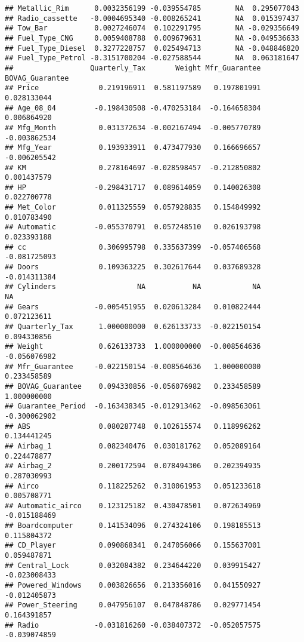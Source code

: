\documentclass[]{article}
\begin{document}
\begin{verbatim}
## Metallic_Rim      0.0032356199 -0.039554785        NA  0.295077043
## Radio_cassette   -0.0004695340 -0.008265241        NA  0.015397437
## Tow_Bar           0.0027246074  0.102291795        NA -0.029356649
## Fuel_Type_CNG     0.0059408788  0.009679631        NA -0.049536633
## Fuel_Type_Diesel  0.3277228757  0.025494713        NA -0.048846820
## Fuel_Type_Petrol -0.3151700204 -0.027588544        NA  0.063181647
##                  Quarterly_Tax       Weight Mfr_Guarantee BOVAG_Guarantee
## Price              0.219196911  0.581197589   0.197801991     0.028133044
## Age_08_04         -0.198430508 -0.470253184  -0.164658304     0.006864920
## Mfg_Month          0.031372634 -0.002167494  -0.005770789    -0.003862534
## Mfg_Year           0.193933911  0.473477930   0.166696657    -0.006205542
## KM                 0.278164697 -0.028598457  -0.212850802     0.001437579
## HP                -0.298431717  0.089614059   0.140026308     0.022700778
## Met_Color          0.011325559  0.057928835   0.154849992     0.010783490
## Automatic         -0.055370791  0.057248510   0.026193798     0.023393188
## cc                 0.306995798  0.335637399  -0.057406568    -0.081725093
## Doors              0.109363225  0.302617644   0.037689328    -0.014311384
## Cylinders                   NA           NA            NA              NA
## Gears             -0.005451955  0.020613284   0.010822444     0.072123611
## Quarterly_Tax      1.000000000  0.626133733  -0.022150154     0.094330856
## Weight             0.626133733  1.000000000  -0.008564636    -0.056076982
## Mfr_Guarantee     -0.022150154 -0.008564636   1.000000000     0.233458589
## BOVAG_Guarantee    0.094330856 -0.056076982   0.233458589     1.000000000
## Guarantee_Period  -0.163438345 -0.012913462  -0.098563061    -0.300062902
## ABS                0.080287748  0.102615574   0.118996262     0.134441245
## Airbag_1           0.082340476  0.030181762   0.052089164     0.224478877
## Airbag_2           0.200172594  0.078494306   0.202394935     0.287030993
## Airco              0.118225262  0.310061953   0.051233618     0.005708771
## Automatic_airco    0.123125182  0.430478501   0.072634969    -0.015188469
## Boardcomputer      0.141534096  0.274324106   0.198185513     0.115804372
## CD_Player          0.090868341  0.247056066   0.155637001     0.059487871
## Central_Lock       0.032084382  0.234644220   0.039915427    -0.023008433
## Powered_Windows    0.003826656  0.213356016   0.041550927    -0.012405873
## Power_Steering     0.047956107  0.047848786   0.029771454     0.164391857
## Radio             -0.031816260 -0.038407372  -0.052057575    -0.039074859

\end{verbatim}
\end{document}
